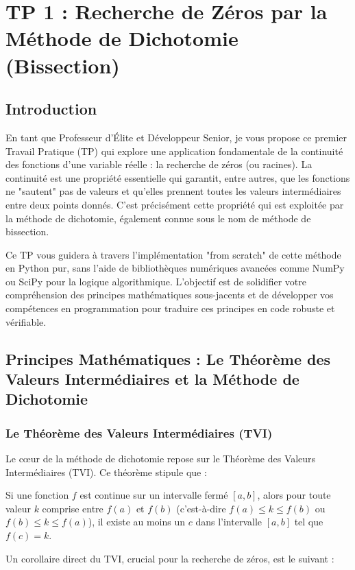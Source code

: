 \documentclass[12pt,a4paper]{report}
\begin{document}
\section{TP 1 : Recherche de Zéros par la Méthode de Dichotomie (Bissection)}

\subsection{Introduction}

En tant que Professeur d'Élite et Développeur Senior, je vous propose ce premier Travail Pratique (TP) qui explore une application fondamentale de la continuité des fonctions d'une variable réelle : la recherche de zéros (ou racines). La continuité est une propriété essentielle qui garantit, entre autres, que les fonctions ne "sautent" pas de valeurs et qu'elles prennent toutes les valeurs intermédiaires entre deux points donnés. C'est précisément cette propriété qui est exploitée par la méthode de dichotomie, également connue sous le nom de méthode de bissection.

Ce TP vous guidera à travers l'implémentation "from scratch" de cette méthode en Python pur, sans l'aide de bibliothèques numériques avancées comme NumPy ou SciPy pour la logique algorithmique. L'objectif est de solidifier votre compréhension des principes mathématiques sous-jacents et de développer vos compétences en programmation pour traduire ces principes en code robuste et vérifiable.

\subsection{Principes Mathématiques : Le Théorème des Valeurs Intermédiaires et la Méthode de Dichotomie}

\subsubsection{Le Théorème des Valeurs Intermédiaires (TVI)}

Le cœur de la méthode de dichotomie repose sur le Théorème des Valeurs Intermédiaires (TVI). Ce théorème stipule que :

Si une fonction $f$ est continue sur un intervalle fermé $[a, b]$, alors pour toute valeur $k$ comprise entre $f(a)$ et $f(b)$ (c'est-à-dire $f(a) \le k \le f(b)$ ou $f(b) \le k \le f(a)$), il existe au moins un $c$ dans l'intervalle $[a, b]$ tel que $f(c) = k$.

Un corollaire direct du TVI, crucial pour la recherche de zéros, est le suivant :
\end{document}
